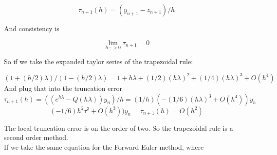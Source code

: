 \documentclass{article}
\begin{document}
\begin{equation}
    \tau_{n+1}(h) = (y_{n+1} - z_{n+1})/h
\end{equation}

And consistency is

\begin{equation}
    \lim_{h->0}\tau_{n+1} = 0
\end{equation}

So if we take the expanded taylor series of the trapezoidal rule:

\begin{equation}
    (1+(h/2)\lambda)/(1-(h/2)\lambda) = 1 + h\lambda + (1/2)(h\lambda)^2 + (1/4)(h\lambda)^3 + O(h^4)
\end{equation}
And plug that into the truncation error
\begin{equation}
    \tau_{n+1}(h) = ((e^{h\lambda} - Q(h\lambda))y_n)/h = (1/h)(-(1/6)(h\lambda)^3 + O(h^4))y_n    
\end{equation}
\begin{equation}
    (-1/6)h^2\tau^3 + O(h^3))y_n = \tau_{n+1}(h) = O(h^2)
\end{equation}

The local truncation error is on the order of two. So the trapezoidal rule is a second order method.\\

If we take the same equation for the Forward Euler method, where 




\end{document}
